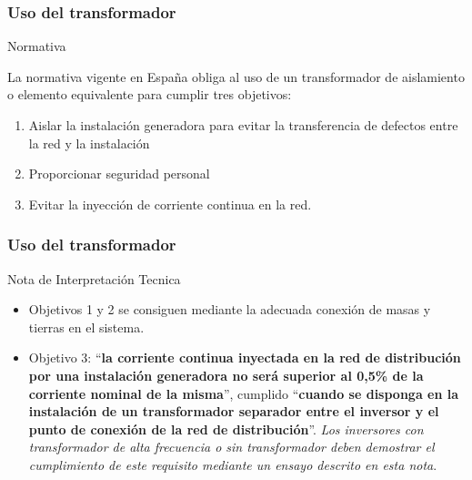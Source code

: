 \documentclass[serif, xcolor=dvipsnames]{beamer}
\begin{document}
\begin{frame}
  \frametitle{Uso del transformador}
  \begin{block} {Normativa}

    La normativa vigente en España obliga al uso de un transformador
    de aislamiento o elemento equivalente para cumplir tres objetivos:
    \begin{enumerate}
    \item Aislar la instalación generadora para evitar la
      transferencia de defectos entre la red y la instalación
    \item Proporcionar seguridad personal
    \item Evitar la inyección de corriente continua en la red.
    \end{enumerate}

  \end{block}

\end{frame}

\begin{frame}
  \frametitle{Uso del transformador}
  \begin{block} {Nota de Interpretación Tecnica}
    \begin{itemize}
    \item Objetivos 1 y 2 se consiguen mediante la adecuada conexión
      de masas y tierras en el sistema.
    \item Objetivo 3: ``\textbf{la corriente continua inyectada en la red de
      distribución por una instalación generadora no será superior al
      0,5\% de la corriente nominal de la misma}'', cumplido ``\textbf{cuando
      se disponga en la instalación de un transformador separador
      entre el inversor y el punto de conexión de la red de
      distribución}''. \emph{Los inversores con transformador de alta
      frecuencia o sin transformador deben demostrar el cumplimiento
      de este requisito mediante un ensayo descrito en esta nota}.
    \end{itemize}

  \end{block}

\end{frame}
\end{document}
